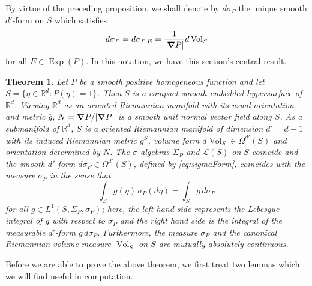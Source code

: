 \documentclass[11pt]{article}
\newtheorem{theorem}{Theorem}[section]
\theoremstyle{remark}
\newcommand\Exp{\operatorname{Exp}}
\newcommand{\Vol}{\operatorname{Vol}}
\begin{document}
\noindent By virtue of the preceding proposition, we shall denote by $d\sigma_P$ the unique smooth $d'$-form on $S$ which satisfies
\begin{equation}\label{eq:sigmaForm}
    d\sigma_P=d\sigma_{P,E}=\frac{1}{|\grad P|}d\Vol_S
\end{equation}
for all $E\in\Exp(P)$. In this notation, we have this section's central result.




\begin{theorem}\label{thm:RiemannLebesgue}
Let $P$ be a smooth positive homogeneous function and let $S=\{\eta\in\mathbb{R}^d:P(\eta)=1\}$. Then $S$ is a compact smooth embedded hypersurface of $\mathbb{R}^d$. Viewing $\mathbb{R}^d$ as an oriented Riemannian manifold with its usual orientation and metric $\overline{g}$, $N=\grad P/|\grad P|$ is a smooth unit normal vector field along $S$. As a submanifold of $\mathbb{R}^d$, $S$ is a oriented Riemannian manifold of dimension $d'=d-1$ with its induced Riemannian metric $g^S$, volume form $d\Vol_S\in\Omega^{d'}(S)$ and orientation determined by $N$. The $\sigma$-algebras $\Sigma_P$ and $\mathcal{L}(S)$ on $S$ coincide and the smooth $d'$-form $d\sigma_P\in\Omega^{d'}(S)$, defined by \eqref{eq:sigmaForm}, coincides with the measure $\sigma_P$ in the sense that
\begin{equation}\label{eq:FormsAndMeasures}
\int_S g(\eta)\,\sigma_P(d\eta)=\int_S g\,d\sigma_P
\end{equation}
for all $g\in L^1(S,\Sigma_P,\sigma_P)$; here, the left hand side represents the Lebesgue integral of $g$ with respect to $\sigma_P$ and the right hand side is the integral of the measurable $d'$-form $g\, d\sigma_P$. Furthermore, the measure $\sigma_P$ and the canonical Riemannian volume measure $\Vol_S$ on $S$ are mutually absolutely continuous.
\end{theorem}

\noindent Before we are able to prove the above theorem, we first treat two lemmas which we will find useful in computation.
\end{document}
